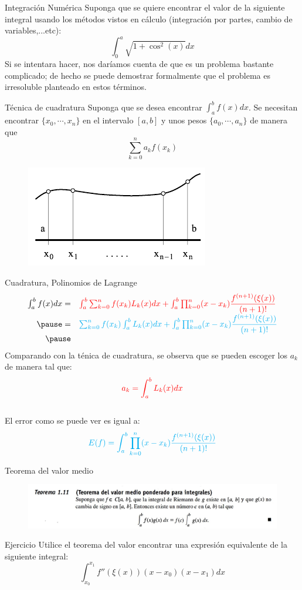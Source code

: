 \begin{frame}[allowframebreaks]{Integración Numérica}
\indent Suponga que se quiere encontrar el valor de la siguiente integral usando los métodos vistos en cálculo (integración por partes, cambio de variables,...etc):
$$\int_{0}^{a}\sqrt{1+\cos^2(x)}dx$$
\indent Si se intentara hacer, nos daríamos cuenta de que es un problema bastante complicado; de hecho se puede demostrar formalmente que el problema es irresoluble planteado en estos términos. 
\begin{block}{Técnica de cuadratura}
Suponga que se desea encontrar $\displaystyle \int_{a}^{b}f(x)dx$. Se necesitan encontrar $\{x_0,\cdots, x_n\}$ en el intervalo $[a,b]$ y unos pesos $\{a_0,\cdots,a_n\}$ de manera que $$\sum_{k=0}^{n}a_kf(x_k)$$
\end{block}
\begin{figure}[H]
\centering
\includegraphics[scale=0.4]{Imagen62}
\end{figure}
\end{frame}
\begin{frame}{Cuadratura, Polinomios de Lagrange}
\begin{displaymath}
\begin{array}{rl}
\int_a^b f(x)dx=&\textcolor{red}{\int_a^b\sum_{k=0}^n f(x_k)L_k(x)dx+\int_a^b\prod_{k=0}^{n}(x-x_k)\dfrac{f^{(n+1)}(\xi(x))}{(n+1)!}}\\\pause
=&\textcolor{cyan}{\sum_{k=0}^n f(x_k)\int_a^b L_k(x)dx+\int_a^b\prod_{k=0}^{n}(x-x_k)\dfrac{f^{(n+1)}(\xi(x))}{(n+1)!}}\\\pause
\end{array}
\end{displaymath}
Comparando con la ténica de cuadratura, se observa que se pueden escoger los $a_k$ de manera tal que: 
$$\textcolor{red}{a_k=\int_a^b L_k(x)dx}$$\\\pause
El error como se puede ver es igual a:
$$\textcolor{cyan}{E(f)=\int_a^b\prod_{k=0}^{n}(x-x_k)\dfrac{f^{(n+1)}(\xi(x))}{(n+1)!}}$$
\end{frame}
\begin{frame}{Teorema del valor medio}
\begin{figure}[H]
\centering
\includegraphics[scale=0.5]{Imagen7}
\end{figure}
\begin{block}{Ejercicio}
Utilice el teorema del valor encontrar una expresión equivalente de la siguiente integral:
$$\int_{x_0}^{x_1}f''(\xi(x))(x-x_0)(x-x_1)dx$$
\end{block}
\end{frame}
